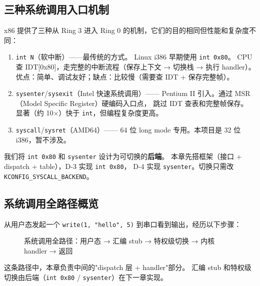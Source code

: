 \subsection{三种系统调用入口机制}
\label{sec:syscall-mechanisms}

x86 提供了三种从 Ring 3 进入 Ring 0 的机制，它们的目的相同但性能和复杂度不同：

\begin{enumerate}
  \item \texttt{int N}（软中断）——最传统的方式。
    Linux i386 早期使用 \texttt{int 0x80}。
    CPU 查 IDT[0x80]，走完整的中断流程（保存上下文 → 切换栈 → 执行 handler）。
    优点：简单、调试友好；缺点：比较慢（需要查 IDT + 保存完整帧）。

  \item \texttt{sysenter}/\texttt{sysexit}（Intel 快速系统调用）——
    Pentium II 引入。通过 MSR（Model Specific Register）硬编码入口点，
    跳过 IDT 查表和完整帧保存。
    显著（约 10×）快于 \texttt{int}，但编程复杂度更高。

  \item \texttt{syscall}/\texttt{sysret}（AMD64）——
    64 位 long mode 专用。本项目是 32 位 i386，暂不涉及。
\end{enumerate}

\begin{designbox}
我们将 \texttt{int 0x80} 和 \texttt{sysenter} 设计为可切换的\textbf{后端}。
本章先搭框架（接口 + dispatch + table），D-3 实现 \texttt{int 0x80}，
D-4 实现 \texttt{sysenter}。切换只需改 \texttt{KCONFIG\_SYSCALL\_BACKEND}。
\end{designbox}

\subsection{系统调用全路径概览}

从用户态发起一个 \texttt{write(1, "hello", 5)} 到串口看到输出，经历以下步骤：

\begin{figure}[H]
  \centering
  
  \caption{系统调用全路径：用户态 → 汇编 stub → 特权级切换 → 内核 handler → 返回}
  \label{fig:syscall-overview}
\end{figure}

这条路径中，本章负责中间的"dispatch 层 + handler"部分。
汇编 stub 和特权级切换由后端（\texttt{int 0x80} / \texttt{sysenter}）在下一章实现。

